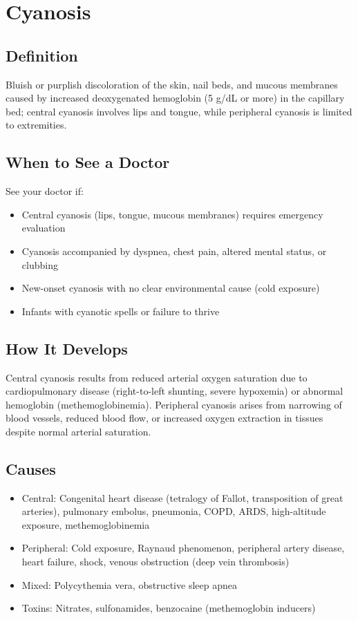 \chapter{Cyanosis}

\section*{Definition}
Bluish or purplish discoloration of the skin, nail beds, and mucous membranes caused by increased deoxygenated hemoglobin (5 g/dL or more) in the capillary bed; central cyanosis involves lips and tongue, while peripheral cyanosis is limited to extremities.

\section*{When to See a Doctor}
See your doctor if:
\begin{itemize}
  \item Central cyanosis (lips, tongue, mucous membranes) requires emergency evaluation
  \item Cyanosis accompanied by dyspnea, chest pain, altered mental status, or clubbing
  \item New-onset cyanosis with no clear environmental cause (cold exposure)
  \item Infants with cyanotic spells or failure to thrive
\end{itemize}

\section*{How It Develops}
Central cyanosis results from reduced arterial oxygen saturation due to cardiopulmonary disease (right-to-left shunting, severe hypoxemia) or abnormal hemoglobin (methemoglobinemia). Peripheral cyanosis arises from narrowing of blood vessels, reduced blood flow, or increased oxygen extraction in tissues despite normal arterial saturation.

\section*{Causes}
\begin{itemize}
  \item Central: Congenital heart disease (tetralogy of Fallot, transposition of great arteries), pulmonary embolus, pneumonia, COPD, ARDS, high-altitude exposure, methemoglobinemia
  \item Peripheral: Cold exposure, Raynaud phenomenon, peripheral artery disease, heart failure, shock, venous obstruction (deep vein thrombosis)
  \item Mixed: Polycythemia vera, obstructive sleep apnea
  \item Toxins: Nitrates, sulfonamides, benzocaine (methemoglobin inducers)
\end{itemize}

